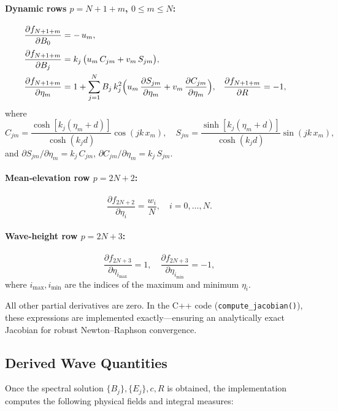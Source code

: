 \documentclass[11pt,letterpaper]{article}
\begin{document}
\paragraph{Dynamic rows \(p=N+1+m\), \(0\le m\le N\):}
\begin{align}
\frac{\partial f_{N+1+m}}{\partial B_{0}}
  &= -\,u_{m},
  \\[0.5ex]
\frac{\partial f_{N+1+m}}{\partial B_{j}}
  &= k_{j}\,\bigl(u_{m}\,C_{jm} + v_{m}\,S_{jm}\bigr),
  \\
\frac{\partial f_{N+1+m}}{\partial \eta_{m}}
  &= 1
     + \sum_{j=1}^{N}
       B_{j}\,k_{j}^{2}
       \Bigl(u_{m}\,\frac{\partial S_{jm}}{\partial \eta_{m}}
           + v_{m}\,\frac{\partial C_{jm}}{\partial \eta_{m}}\Bigr),
  &
\frac{\partial f_{N+1+m}}{\partial R}
  &= -1,
\end{align}
where
\[
C_{jm} = \frac{\cosh[k_{j}(\eta_{m}+d)]}{\cosh(k_{j}d)}\cos(jk\,x_{m}), 
\quad
S_{jm} = \frac{\sinh[k_{j}(\eta_{m}+d)]}{\cosh(k_{j}d)}\sin(jk\,x_{m}),
\]
and
\(\partial S_{jm}/\partial \eta_{m} = k_{j} \,C_{jm}\), 
\(\partial C_{jm}/\partial \eta_{m} = k_{j} \,S_{jm}.\)

\paragraph{Mean‐elevation row \(p=2N+2\):}
\[
\frac{\partial f_{2N+2}}{\partial \eta_{i}}
  = \frac{w_i}{N},\quad i=0,\dots,N.
\]

\paragraph{Wave‐height row \(p=2N+3\):}
\[
\frac{\partial f_{2N+3}}{\partial \eta_{i_{\max}}} = 1,
\quad
\frac{\partial f_{2N+3}}{\partial \eta_{i_{\min}}} = -1,
\]
where \(i_{\max},i_{\min}\) are the indices of the maximum and minimum \(\eta_{i}\).

\medskip
All other partial derivatives are zero.  In the C++ code (\texttt{compute\_jacobian()}), these expressions are implemented exactly—ensuring an analytically exact Jacobian for robust Newton–Raphson convergence.

\subsection{Derived Wave Quantities}
\label{sec:derived_quantities}

Once the spectral solution \(\{B_j\},\{E_j\},c,R\) is obtained, the implementation computes the following physical fields and integral measures:
\end{document}
